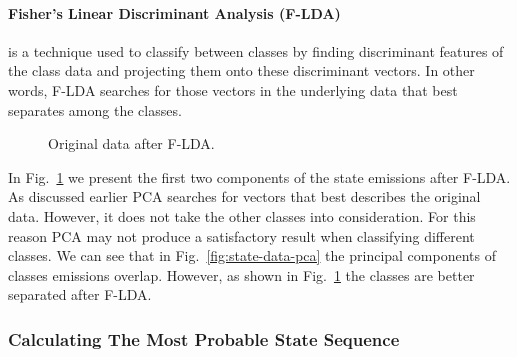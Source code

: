 \documentclass[lnicst]{svmultln}
\begin{document}
\paragraph{\textbf{Fisher's Linear Discriminant Analysis (F-LDA)}} is a technique used to classify between classes by finding discriminant features of the class data and projecting them onto these discriminant vectors. In other words, F-LDA searches for those vectors in the underlying data that best separates among the classes.

\begin{figure}[h]
	\centering
	\caption{Original data after F-LDA.}\label{fig:state-data-lda}
\end{figure}

In Fig.~\ref{fig:state-data-lda} we present the first two components of the state emissions after F-LDA. As discussed earlier PCA searches for vectors that best describes the original data. However, it does not take the other classes into consideration. For this reason PCA may not produce a satisfactory result when classifying different classes. We can see that in Fig.~\ref{fig:state-data-pca} the principal components of classes emissions overlap. However, as shown in Fig.~\ref{fig:state-data-lda} the classes are better separated after F-LDA.

\subsubsection{Calculating The Most Probable State Sequence}
\label{subsec:exp-viterbi}
\end{document}
